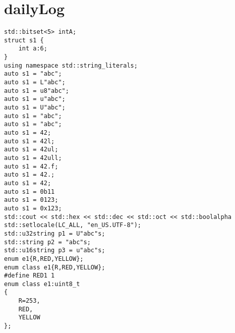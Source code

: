 \section{dailyLog} 
\begin{lstlisting}
std::bitset<5> intA;
struct s1 {
    int a:6;
}
using namespace std::string_literals;  
auto s1 = "abc";
auto s1 = L"abc";
auto s1 = u8"abc";
auto s1 = u"abc";
auto s1 = U"abc";
auto s1 = "abc";
auto s1 = "abc";
auto s1 = 42;
auto s1 = 42l;
auto s1 = 42ul;
auto s1 = 42ull;
auto s1 = 42.f;
auto s1 = 42.;
auto s1 = 42;
auto s1 = 0b11
auto s1 = 0123;
auto s1 = 0x123;
std::cout << std::hex << std::dec << std::oct << std::boolalpha
std::setlocale(LC_ALL, "en_US.UTF-8");
std::u32string p1 = U"abc"s;
std::string p2 = "abc"s;
std::u16string p3 = u"abc"s;
enum e1{R,RED,YELLOW};
enum class e1{R,RED,YELLOW};
#define RED1 1
enum class e1:uint8_t
{
    R=253,
    RED,
    YELLOW
};





\end{lstlisting}
